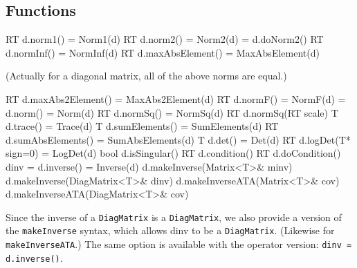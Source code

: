 \documentclass[twoside,letterpaper,11pt]{article}
\renewcommand{\tt}[1]{{\lstinline {#1}}}
\begin{document}
\subsection{Functions}
\label{DiagMatrix_Functions}

\begin{tmvcode}
RT d.norm1() = Norm1(d)
RT d.norm2() = Norm2(d) = d.doNorm2()
RT d.normInf() = NormInf(d)
RT d.maxAbsElement() = MaxAbsElement(d)
\end{tmvcode}
(Actually for a diagonal matrix, all of the above norms are equal.)
\begin{tmvcode}
RT d.maxAbs2Element() = MaxAbs2Element(d)
RT d.normF() = NormF(d) = d.norm() = Norm(d)
RT d.normSq() = NormSq(d)
RT d.normSq(RT scale)
T d.trace() = Trace(d)
T d.sumElements() = SumElements(d)
RT d.sumAbsElements() = SumAbsElements(d)
T d.det() = Det(d)
RT d.logDet(T* sign=0) = LogDet(d)
bool d.isSingular()
RT d.condition()
RT d.doCondition()
dinv = d.inverse() = Inverse(d)
d.makeInverse(Matrix<T>& minv)
d.makeInverse(DiagMatrix<T>& dinv)
d.makeInverseATA(Matrix<T>& cov)
d.makeInverseATA(DiagMatrix<T>& cov)
\end{tmvcode}
Since the inverse of a \tt{DiagMatrix} is a \tt{DiagMatrix},
we also provide a version of the \tt{makeInverse} syntax, which allows dinv
to be a \tt{DiagMatrix}.  (Likewise for \tt{makeInverseATA}.)  The same option is 
available with the operator version: \tt{dinv = d.inverse()}.
\end{document}
